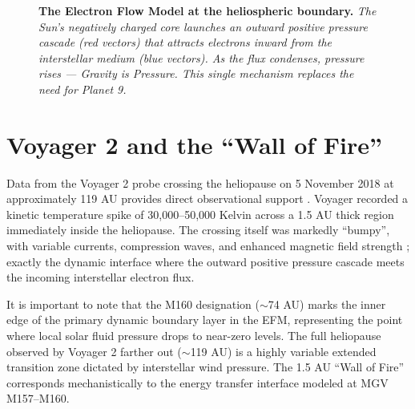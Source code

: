 \documentclass[11pt, a4paper]{article}
\begin{document}
\begin{figure}[H]
  \caption{\textbf{The Electron Flow Model at the heliospheric boundary.} \textit{The Sun’s negatively charged core launches an outward positive pressure cascade (red vectors) that attracts electrons inward from the interstellar medium (blue vectors). As the flux condenses, pressure rises — Gravity is Pressure. This single mechanism replaces the need for Planet 9.}}
  \label{fig:cascade}
\end{figure}

\clearpage
\section{Voyager 2 and the ``Wall of Fire''}
Data from the Voyager 2 probe crossing the heliopause on 5 November 2018 at approximately 119 AU provides direct observational support \cite{voyager2019, richardson2019}. Voyager recorded a kinetic temperature spike of 30,000--50,000 Kelvin across a 1.5 AU thick region immediately inside the heliopause. The crossing itself was markedly ``bumpy'', with variable currents, compression waves, and enhanced magnetic field strength \cite{owens2013}; exactly the dynamic interface where the outward positive pressure cascade meets the incoming interstellar electron flux.

It is important to note that the M160 designation ($\sim$74 AU) marks the inner edge of the primary dynamic boundary layer in the EFM, representing the point where local solar fluid pressure drops to near-zero levels. The full heliopause observed by Voyager 2 farther out ($\sim$119 AU) is a highly variable extended transition zone dictated by interstellar wind pressure. The 1.5 AU ``Wall of Fire'' corresponds mechanistically to the energy transfer interface modeled at MGV M157--M160.
\end{document}
